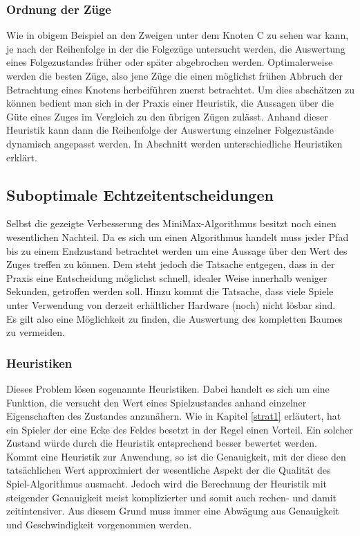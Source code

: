 \subsubsection{Ordnung der Züge}
Wie in obigem Beispiel an den Zweigen unter dem Knoten C zu sehen war kann, je nach der Reihenfolge in der die Folgezüge untersucht werden, die Auswertung eines Folgezustandes früher oder später abgebrochen werden. Optimalerweise werden die besten Züge, also jene Züge die einen möglichst frühen Abbruch der Betrachtung eines Knotens herbeiführen zuerst betrachtet. Um dies abschätzen zu können bedient man sich in der Praxis einer Heuristik, die Aussagen über die Güte eines Zuges im Vergleich zu den übrigen Zügen zulässt. Anhand dieser Heuristik kann dann die Reihenfolge der Auswertung einzelner Folgezustände dynamisch angepasst werden. In Abschnitt  werden unterschiedliche Heuristiken erklärt.

\subsection{Suboptimale Echtzeitentscheidungen}
Selbst die gezeigte Verbesserung des MiniMax-Algorithmus besitzt noch einen wesentlichen Nachteil. Da es sich um einen  Algorithmus handelt muss jeder Pfad bis zu einem Endzustand betrachtet werden um eine Aussage über den Wert des Zuges treffen zu können. Dem steht jedoch die Tatsache entgegen, dass in der Praxis eine Entscheidung möglichst schnell, idealer Weise innerhalb weniger Sekunden, getroffen werden soll. Hinzu kommt die Tatsache, dass viele Spiele unter Verwendung von derzeit erhältlicher Hardware (noch) nicht lösbar sind.\\
Es gilt also eine Möglichkeit zu finden, die Auswertung des kompletten Baumes zu vermeiden.

\subsubsection{Heuristiken}
\label{Heuristiken}
Dieses Problem lösen sogenannte Heuristiken. Dabei handelt es sich um eine Funktion, die versucht den Wert eines Spielzustandes anhand einzelner Eigenschaften des Zustandes anzunähern. Wie in Kapitel \ref{strat1} erläutert, hat ein Spieler der eine Ecke des Feldes besetzt in der Regel einen Vorteil. Ein solcher Zustand würde durch die Heuristik entsprechend besser bewertet werden.
\\Kommt eine Heuristik zur Anwendung, so ist die Genauigkeit, mit der diese den tatsächlichen Wert approximiert der wesentliche Aspekt der die Qualität des Spiel-Algorithmus ausmacht. Jedoch wird die Berechnung der Heuristik mit steigender Genauigkeit meist komplizierter und somit auch rechen- und damit zeitintensiver. Aus diesem Grund muss immer eine Abwägung aus Genauigkeit und Geschwindigkeit vorgenommen werden. 

